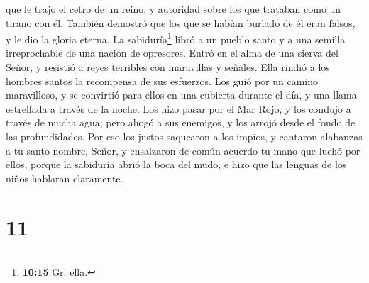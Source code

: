 que le trajo el cetro de un reino, y autoridad sobre los que trataban
como un tirano con él. También demostró que los que se habían burlado de
él eran falsos, y le dio la gloria eterna.  La
sabiduría\footnote{\textbf{10:15} Gr. ella.} libró a un pueblo santo y a
una semilla irreprochable de una nación de opresores. 
Entró en el alma de una sierva del Señor, y resistió a reyes terribles
con maravillas y señales.  Ella rindió a los hombres
santos la recompensa de sus esfuerzos. Los guió por un camino
maravilloso, y se convirtió para ellos en una cubierta durante el día, y
una llama estrellada a través de la noche.  Los hizo
pasar por el Mar Rojo, y los condujo a través de mucha agua;
 pero ahogó a sus enemigos, y los arrojó desde el fondo
de las profundidades.  Por eso los justos saquearon a los
impíos, y cantaron alabanzas a tu santo nombre, Señor, y ensalzaron de
común acuerdo tu mano que luchó por ellos,  porque la
sabiduría abrió la boca del mudo, e hizo que las lenguas de los niños
hablaran claramente.

\hypertarget{section-10}{%
\section{11}\label{section-10}}

